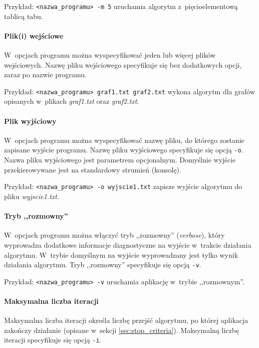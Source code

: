 Przykład: \verb+<nazwa_programu> -m 5+ uruchamia algorytm z~pięcioelementową tablicą tabu.

\paragraph{Plik(i) wejściowe}

W~opcjach programu można wyspecyfikować jeden lub więcej plików wejściowych. Nazwę pliku wejściowego specyfikuje się bez dodatkowych opcji, zaraz po nazwie programu.

Przykład: \verb+<nazwa_programu> graf1.txt graf2.txt+ wykona algorytm dla grafów opisanych w~plikach \emph{graf1.txt} oraz \emph{graf2.txt}.

\paragraph{Plik wyjściowy}

W~opcjach programu można wyspecyfikować nazwę pliku, do którego zostanie zapisane wyjście programu. Nazwę pliku wyjściowego specyfikuje się opcją \verb+-o+. Nazwa pliku wyjściowego jest parametrem opcjonalnym. Domyślnie wyjście przekierowywane jest na standardowy strumień (konsolę).

Przykład: \verb+<nazwa_programu> -o wyjscie1.txt+ zapisze wyjście algorytmu do pliku \emph{wyjscie1.txt}.

\paragraph{Tryb ,,rozmowny''}

W~opcjach programu można włączyć tryb ,,rozmowny'' (\emph{verbose}), który wyprowadza dodatkowe informacje diagnostyczne na wyjście w~trakcie działania algorytmu. W~trybie domyślnym na wyjście wyprowadzany jest tylko wynik działania algorytmu. Tryb ,,rozmowny'' specyfikuje się opcją \verb+-v+.

Przykład: \verb+<nazwa_programu> -v+ uruchamia aplikację w~trybie ,,rozmownym''.

\paragraph{Maksymalna liczba iteracji}

Maksymalna liczba iteracji określa liczbę przejść algorytmu, po której aplikacja zakończy działanie (opisane w~sekcji \ref{sec:stop_criteria}). Maksymalną liczbę iteracji specyfikuje się opcją \verb+-i+.

